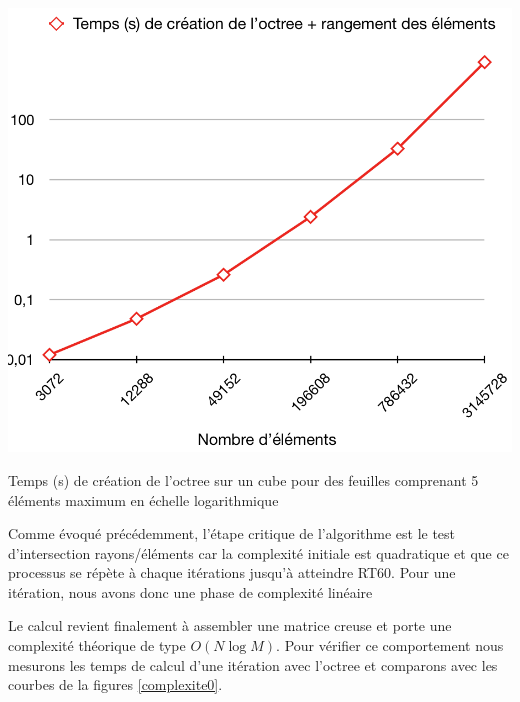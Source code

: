  \begin{figureth}
	\includegraphics[width=0.4\linewidth]{images/tempsOctree}
	\caption{Temps (s) de création de l'octree sur un cube pour des feuilles comprenant 5 éléments maximum en échelle logarithmique}
	\label{tempsOctree}
\end{figureth}



Comme évoqué précédemment, l'étape critique de l'algorithme est le test d'intersection rayons/éléments car la complexité initiale est quadratique et que ce processus se répète à chaque itérations jusqu'à atteindre \gls{RT60}. Pour une itération, nous avons donc une phase de complexité linéaire

Le calcul revient finalement à assembler une matrice creuse et porte une complexité théorique de type $O(N\log{M})$. 
Pour vérifier ce comportement nous mesurons les temps de calcul d'une itération avec l'\gls{octree} et comparons avec les courbes de la figures \ref{complexite0}.




